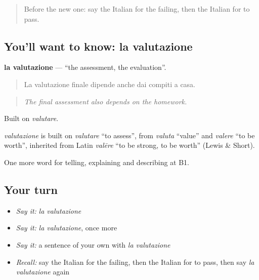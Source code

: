 \begin{quote}
Before the new one: say the Italian for the failing, then the Italian for to pass.
\end{quote}

\subsection*{You'll want to know: la valutazione}
\textbf{la valutazione} — \textquotedblleft{}the assessment, the evaluation\textquotedblright{}.

\begin{quote}
La valutazione finale dipende anche dai compiti a casa.
\end{quote}

\begin{quote}
\emph{The final assessment also depends on the homework.}
\end{quote}

Built on \emph{valutare}.

\begin{cousinweb}
\emph{valutazione} is built on \emph{valutare} \textquotedblleft{}to assess\textquotedblright{}, from \emph{valuta} \textquotedblleft{}value\textquotedblright{} and \emph{valere} \textquotedblleft{}to be worth\textquotedblright{}, inherited from Latin \emph{valēre} \textquotedblleft{}to be strong, to be worth\textquotedblright{} (Lewis \& Short).
\end{cousinweb}

\begin{grammarlens}[title={What you've built}]
One more word for telling, explaining and describing at B1.
\end{grammarlens}

\subsection*{Your turn}
\begin{itemize}
\raggedright
  \item \emph{Say it:} \emph{la valutazione}
  \item \emph{Say it:} \emph{la valutazione}, once more
  \item \emph{Say it:} a sentence of your own with \emph{la valutazione}
  \item \emph{Recall:} say the Italian for the failing, then the Italian for to pass, then say \emph{la valutazione} again
\end{itemize}

